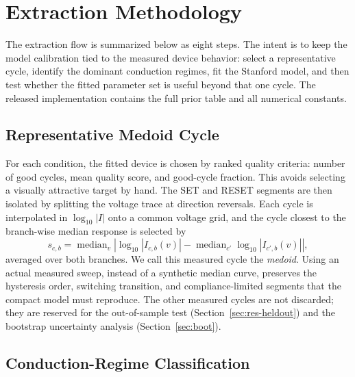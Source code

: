 \documentclass[journal]{IEEEtran}
\begin{document}
\section{Extraction Methodology}
\label{sec:method}

The extraction flow is summarized below as eight steps.  The intent is to
keep the model calibration tied to the measured device behavior:
select a representative cycle, identify the dominant conduction regimes, fit
the Stanford model, and then test whether the fitted parameter set is useful
beyond that one cycle.  The released implementation contains the full prior
table and all numerical constants.

\subsection{Representative Medoid Cycle}
\label{sec:medoid}

For each condition, the fitted device is chosen by ranked quality criteria:
number of good cycles, mean quality score, and good-cycle fraction.  This
avoids selecting a visually attractive target by hand.  The SET and RESET
segments are then isolated by splitting the voltage trace at direction
reversals.  Each cycle is interpolated in $\log_{10}|I|$ onto a common
voltage grid, and the cycle closest to the branch-wise median response is
selected by
\begin{equation}
  s_{c,b} =
  \operatorname{median}_{v}\left|
  \log_{10}|I_{c,b}(v)| -
  \operatorname{median}_{c'}\log_{10}|I_{c',b}(v)|
  \right|,
  \label{eq:medoid-score}
\end{equation}
averaged over both branches.  We call this measured cycle the \emph{medoid}.
Using an actual measured sweep, instead of a synthetic median curve,
preserves the hysteresis order, switching transition, and compliance-limited
segments that the compact model must reproduce.  The other measured cycles
are not discarded; they are reserved for the out-of-sample test
(Section~\ref{sec:res-heldout}) and the bootstrap uncertainty analysis
(Section~\ref{sec:boot}).

\subsection{Conduction-Regime Classification}
\label{sec:regimes}
\end{document}
